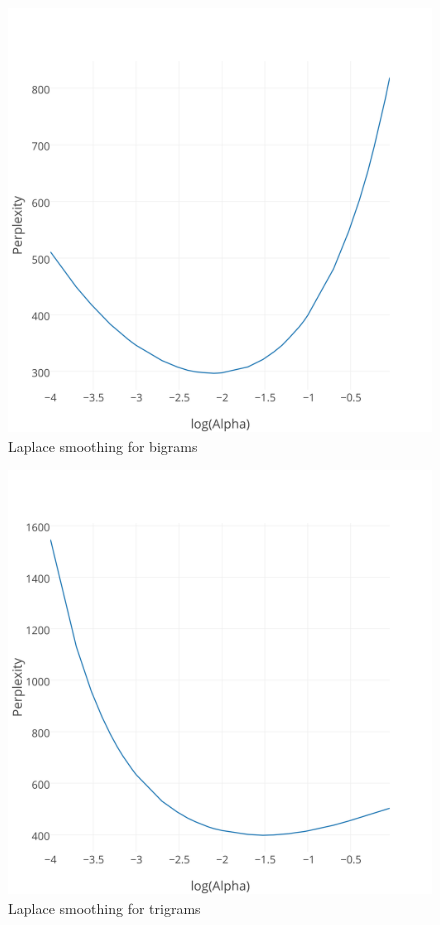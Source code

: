 \documentclass[11pt]{article}
\begin{document}
\begin{figure}[f]
  \centering
  \includegraphics{laplace_2grams.png} \caption{Laplace smoothing for bigrams} \label{fig:laplace2}
\end{figure}


\begin{figure}[f]
  \centering
  \includegraphics{laplace_3grams.png}
  \caption{Laplace smoothing for trigrams}
  \label{fig:laplace3}
\end{figure}
\end{document}
